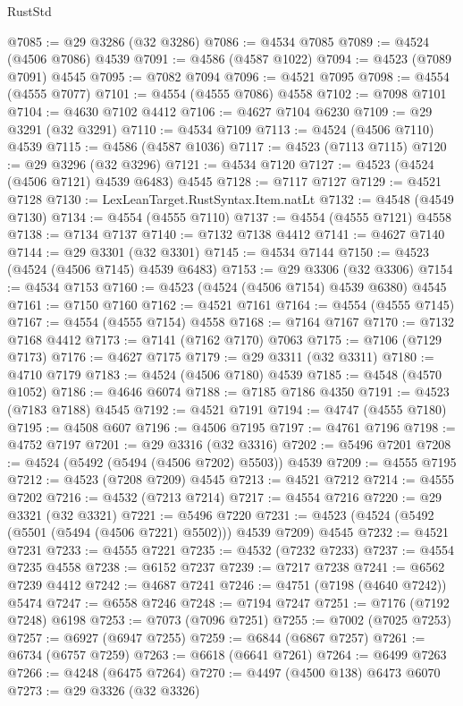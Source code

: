 \begin{lexlean}{RustStd}
\begin{coremodule}
@7085 := @29 @3286 (@32 @3286)
@7086 := @4534 @7085
@7089 := @4524 (@4506 @7086) @4539
@7091 := @4586 (@4587 @1022)
@7094 := @4523 (@7089 @7091) @4545
@7095 := @7082 @7094
@7096 := @4521 @7095
@7098 := @4554 (@4555 @7077)
@7101 := @4554 (@4555 @7086) @4558
@7102 := @7098 @7101
@7104 := @4630 @7102 @4412
@7106 := @4627 @7104 @6230
@7109 := @29 @3291 (@32 @3291)
@7110 := @4534 @7109
@7113 := @4524 (@4506 @7110) @4539
@7115 := @4586 (@4587 @1036)
@7117 := @4523 (@7113 @7115)
@7120 := @29 @3296 (@32 @3296)
@7121 := @4534 @7120
@7127 := @4523 (@4524 (@4506 @7121) @4539 @6483) @4545
@7128 := @7117 @7127
@7129 := @4521 @7128
@7130 := LexLeanTarget.RustSyntax.Item.natLt
@7132 := @4548 (@4549 @7130)
@7134 := @4554 (@4555 @7110)
@7137 := @4554 (@4555 @7121) @4558
@7138 := @7134 @7137
@7140 := @7132 @7138 @4412
@7141 := @4627 @7140
@7144 := @29 @3301 (@32 @3301)
@7145 := @4534 @7144
@7150 := @4523 (@4524 (@4506 @7145) @4539 @6483)
@7153 := @29 @3306 (@32 @3306)
@7154 := @4534 @7153
@7160 := @4523 (@4524 (@4506 @7154) @4539 @6380) @4545
@7161 := @7150 @7160
@7162 := @4521 @7161
@7164 := @4554 (@4555 @7145)
@7167 := @4554 (@4555 @7154) @4558
@7168 := @7164 @7167
@7170 := @7132 @7168 @4412
@7173 := @7141 (@7162 @7170) @7063
@7175 := @7106 (@7129 @7173)
@7176 := @4627 @7175
@7179 := @29 @3311 (@32 @3311)
@7180 := @4710 @7179
@7183 := @4524 (@4506 @7180) @4539
@7185 := @4548 (@4570 @1052)
@7186 := @4646 @6074
@7188 := @7185 @7186 @4350
@7191 := @4523 (@7183 @7188) @4545
@7192 := @4521 @7191
@7194 := @4747 (@4555 @7180)
@7195 := @4508 @607
@7196 := @4506 @7195
@7197 := @4761 @7196
@7198 := @4752 @7197
@7201 := @29 @3316 (@32 @3316)
@7202 := @5496 @7201
@7208 := @4524 (@5492 (@5494 (@4506 @7202) @5503)) @4539
@7209 := @4555 @7195
@7212 := @4523 (@7208 @7209) @4545
@7213 := @4521 @7212
@7214 := @4555 @7202
@7216 := @4532 (@7213 @7214)
@7217 := @4554 @7216
@7220 := @29 @3321 (@32 @3321)
@7221 := @5496 @7220
@7231 := @4523 (@4524 (@5492 (@5501 (@5494 (@4506 @7221) @5502))) @4539 @7209) @4545
@7232 := @4521 @7231
@7233 := @4555 @7221
@7235 := @4532 (@7232 @7233)
@7237 := @4554 @7235 @4558
@7238 := @6152 @7237
@7239 := @7217 @7238
@7241 := @6562 @7239 @4412
@7242 := @4687 @7241
@7246 := @4751 (@7198 (@4640 @7242)) @5474
@7247 := @6558 @7246
@7248 := @7194 @7247
@7251 := @7176 (@7192 @7248) @6198
@7253 := @7073 (@7096 @7251)
@7255 := @7002 (@7025 @7253)
@7257 := @6927 (@6947 @7255)
@7259 := @6844 (@6867 @7257)
@7261 := @6734 (@6757 @7259)
@7263 := @6618 (@6641 @7261)
@7264 := @6499 @7263
@7266 := @4248 (@6475 @7264)
@7270 := @4497 (@4500 @138) @6473 @6070
@7273 := @29 @3326 (@32 @3326)

\end{coremodule}
\end{lexlean}
